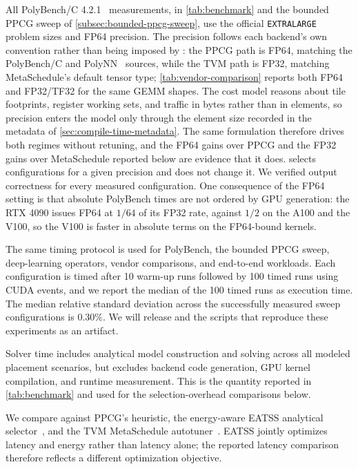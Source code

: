 All PolyBench/C 4.2.1~\cite{polybench} measurements, in \autoref{tab:benchmark} and the bounded PPCG sweep of \autoref{subsec:bounded-ppcg-sweep}, use the official \texttt{EXTRALARGE} problem sizes and FP64 precision. The precision follows each backend's own convention rather than being imposed by \name: the PPCG path is FP64, matching the PolyBench/C and PolyNN~\cite{polynn} sources, while the TVM path is FP32, matching MetaSchedule's default tensor type; \autoref{tab:vendor-comparison} reports both FP64 and FP32/TF32 for the same GEMM shapes. The cost model reasons about tile footprints, register working sets, and traffic in bytes rather than in elements, so precision enters the model only through the element size recorded in the metadata of \autoref{sec:compile-time-metadata}. The same formulation therefore drives both regimes without retuning, and the FP64 gains over PPCG and the FP32 gains over MetaSchedule reported below are evidence that it does. \name selects configurations for a given precision and does not change it. We verified output correctness for every measured configuration. One consequence of the FP64 setting is that absolute PolyBench times are not ordered by GPU generation: the RTX 4090 issues FP64 at \(1/64\) of its FP32 rate, against \(1/2\) on the A100 and the V100, so the V100 is faster in absolute terms on the FP64-bound kernels.

The same timing protocol is used for PolyBench, the bounded PPCG sweep, deep-learning operators, vendor comparisons, and end-to-end workloads. Each configuration is timed after 10 warm-up runs followed by 100 timed runs using CUDA events, and we report the median of the 100 timed runs as execution time. The median relative standard deviation across the successfully measured sweep configurations is \(0.30\%\). We will release \name and the scripts that reproduce these experiments as an artifact.

Solver time includes analytical model construction and solving across all modeled placement scenarios, but excludes backend code generation, GPU kernel compilation, and runtime measurement. This is the quantity reported in \autoref{tab:benchmark} and used for the selection-overhead comparisons below.

We compare against PPCG's heuristic, the energy-aware EATSS analytical selector~\cite{eatss}, and the TVM MetaSchedule autotuner~\cite{metaschedule}. EATSS jointly optimizes latency and energy rather than latency alone; the reported latency comparison therefore reflects a different optimization objective.

